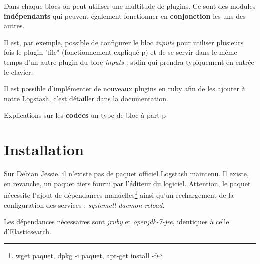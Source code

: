 Dans chaque blocs on peut utiliser une multitude de plugins. Ce sont des modules 
\textbf{indépendants} qui peuvent également fonctionner en \textbf{conjonction} les uns des autres.

Il est, par exemple, possible de configurer le bloc \emph{inputs} pour utiliser 
plusieurs fois le plugin "file" (fonctionnement expliqué p\pageref{lst:conflogstashsyntaxe1}) 
et de se servir dans le même temps d'un autre plugin du bloc \emph{inputs} : stdin 
qui prendra typiquement en entrée le clavier.


Il est possible d'implémenter de nouveaux plugins en ruby afin de les ajouter à
notre Logstash, c'est détailler dans la documentation. 

Explications sur les \textbf{codecs} un type de bloc à part p\pageref{subsec:logstashcodec}






\section{Installation}
%
%
%
%
%
%
%
%
%




Sur Debian Jessie, il n'existe pas de paquet officiel Logstash maintenu. Il existe,
en revanche, un paquet tiers
fourni par l'éditeur du logiciel. Attention, le paquet nécessite l'ajout de dépendances manuelles\footnote{wget paquet, 
dpkg -i paquet, apt-get install -f} ainsi qu'un rechargement de 
la configuration des services : \emph{systemctl daemon-reload}.

Les dépendances nécessaires sont \emph{jruby} et \emph{openjdk-7-jre}, identiques 
à celle d'Elasticsearch.

